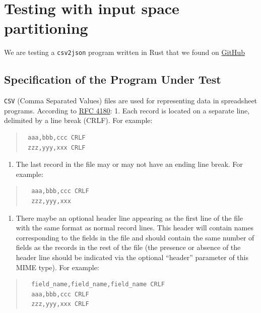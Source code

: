 \documentclass[
]{article}
\author{}
\date{}
\providecommand{\tightlist}{%
  \setlength{\itemsep}{0pt}\setlength{\parskip}{0pt}}
\begin{document}
\section{Testing with input space
partitioning}\label{testing-with-input-space-partitioning}

We are testing a \texttt{csv2json} program written in Rust that we found
on \href{https://github.com/benkay86/csv2json}{GitHub}
\subsection{Specification of the Program Under Test}
\texttt{CSV} (Comma Separated
Values) files are used for representing data in spreadsheet programs.
According to
\href{https://www.rfc-editor.org/info/rfc4180/\#section-2}{RFC 4180}: 1.
Each record is located on a separate line, delimited by a line break
(CRLF). For example:

\begin{quote}
\begin{verbatim}
 aaa,bbb,ccc CRLF
 zzz,yyy,xxx CRLF
\end{verbatim}
\end{quote}

\begin{enumerate}
\def\labelenumi{\arabic{enumi}.}
\setcounter{enumi}{1}
\tightlist
\item
  The last record in the file may or may not have an ending line break.
  For example:
\end{enumerate}

\begin{quote}
\begin{verbatim}
  aaa,bbb,ccc CRLF
  zzz,yyy,xxx
\end{verbatim}
\end{quote}

\begin{enumerate}
\def\labelenumi{\arabic{enumi}.}
\setcounter{enumi}{2}
\tightlist
\item
  There maybe an optional header line appearing as the first line of the
  file with the same format as normal record lines. This header will
  contain names corresponding to the fields in the file and should
  contain the same number of fields as the records in the rest of the
  file (the presence or absence of the header line should be indicated
  via the optional ``header'' parameter of this MIME type). For example:
\end{enumerate}

\begin{quote}
\begin{verbatim}
  field_name,field_name,field_name CRLF
  aaa,bbb,ccc CRLF
  zzz,yyy,xxx CRLF
\end{verbatim}
\end{quote}
\end{document}
